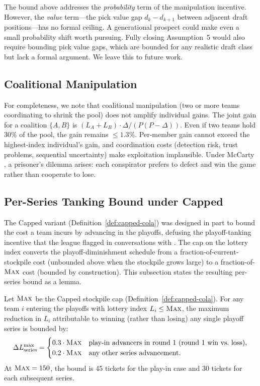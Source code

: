 The bound above addresses the \emph{probability} term of the manipulation incentive. However, the \emph{value} term---the pick value gap $d_k - d_{k+1}$ between adjacent draft positions---has no formal ceiling. A generational prospect could make even a small probability shift worth pursuing. Fully closing Assumption~5 would also require bounding pick value gaps, which are bounded for any realistic draft class but lack a formal argument. We leave this to future work.

\subsection{Coalitional Manipulation}

For completeness, we note that coalitional manipulation (two or more teams coordinating to shrink the pool) does not amplify individual gains. The joint gain for a coalition $\{A, B\}$ is $(L_A + L_B) \cdot \Delta / (P(P - \Delta))$. Even if two teams hold 30\% of the pool, the gain remains ${\leq}1.3\%$. Per-member gain cannot exceed the highest-index individual's gain, and coordination costs (detection risk, trust problems, sequential uncertainty) make exploitation implausible. Under McCarty \cola{}, a prisoner's dilemma arises: each conspirator prefers to defect and win the game rather than cooperate to lose.

\subsection{Per-Series Tanking Bound under Capped \cola{}}
\label{sec:capped-bound}

The Capped \cola{} variant (Definition~\ref{def:capped-cola}) was designed in part to bound the cost a team incurs by advancing in the playoffs, defusing the playoff-tanking incentive that the league flagged in conversations with \citet{highley2026solvable5}. The cap on the lottery index converts the playoff-diminishment schedule from a fraction-of-current-stockpile cost (unbounded above when the stockpile grows large) to a fraction-of-$\textup{\textsc{Max}}$ cost (bounded by construction). This subsection states the resulting per-series bound as a lemma.

\begin{lemma}
\label{lem:capped-series-bound}
Let $\textup{\textsc{Max}}$ be the Capped \cola{} stockpile cap (Definition~\ref{def:capped-cola}). For any team $i$ entering the playoffs with lottery index $L_i \leq \textup{\textsc{Max}}$, the maximum reduction in $L_i$ attributable to winning (rather than losing) any single playoff series is bounded by:
\begin{equation}
\label{eq:capped-bound}
\Delta L_{\text{series}}^{\max} = \begin{cases}
0.3 \cdot \textup{\textsc{Max}} & \text{play-in advancers in round 1 (round 1 win vs.\ loss),} \\
0.2 \cdot \textup{\textsc{Max}} & \text{any other series advancement.}
\end{cases}
\end{equation}
At $\textup{\textsc{Max}} = 150$, the bound is 45 tickets for the play-in case and 30 tickets for each subsequent series.
\end{lemma}


